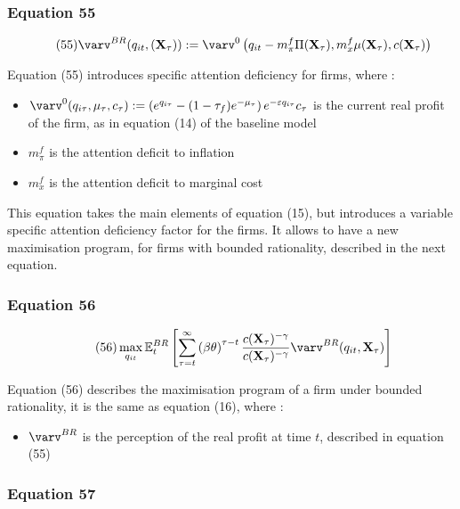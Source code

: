 \documentclass{article}
\begin{document}
\subsubsection*{Equation 55}

\begin{equation}\tag{55}
    \varv^{BR}(q_{it},(\textbf{X}_{\tau})):=\varv^{0}\left(q_{it}-m^{f}_{\pi}\Pi(\textbf{X}_{\tau}),m^{f}_{x}\mu(\textbf{X}_{\tau}),c(\textbf{X}_{\tau})\right)
\end{equation}

Equation (55) introduces specific attention deficiency for firms, where : 
\begin{itemize}
    \item $\varv^{0}(q_{i\tau},\mu_{\tau},c_{\tau}):=\left(e^{q_{i\tau}}-(1-\tau_{f})e^{-\mu_{\tau}}\right)e^{-\varepsilon q_{i\tau}}c_{\tau}$ is the current real profit of the firm, as in equation (14) of the baseline model
    \item $m^{f}_{\pi}$ is the attention deficit to inflation 
    \item $m^{f}_{x}$ is the attention deficit to marginal cost
\end{itemize}

This equation takes the main elements of equation (15), but introduces a variable specific attention deficiency factor for the firms. 
It allows to have a new maximisation program, for firms with bounded rationality, described in the next equation.

\subsubsection*{Equation 56}

\begin{equation}\tag{56}
    \max_{q_{it}}{\mathbb{E}_{t}^{BR}\left[\sum_{\tau=t}^{\infty}\left(\beta\theta\right)^{\tau-t}\frac{c(\textbf{X}_{\tau})^{-\gamma}}{c(\textbf{X}_{\tau})^{-\gamma}}\varv^{BR}(q_{it},\textbf{X}_{\tau})\right]}
\end{equation}

Equation (56) describes the maximisation program of a firm under bounded rationality, it is the same as equation (16), where : 
\begin{itemize}
    \item $\varv^{BR}$ is the perception of the real profit at time $t$, described in equation (55)
\end{itemize}

\subsubsection*{Equation 57}
\end{document}
